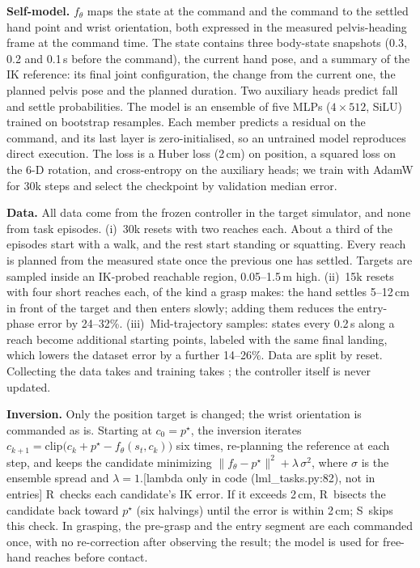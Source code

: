 \documentclass[conference]{IEEEtran}
\newif\ifdraft \drafttrue
\newcommand{\dnote}[1]{\ifdraft{\color{red}\footnotesize[#1]}\fi}
\newcommand{\Sinv}{\textsc{S}}     %
\newcommand{\Rr}{\textsc{R}}       %
\begin{document}
\textbf{Self-model.} $f_\theta$ maps the state at the command and the command to the settled hand point and wrist orientation, both expressed in the measured pelvis-heading frame at the command time. The state contains three body-state snapshots (0.3, 0.2 and 0.1\,s before the command), the current hand pose, and a summary of the IK reference: its final joint configuration, the change from the current one, the planned pelvis pose and the planned duration. Two auxiliary heads predict fall and settle probabilities. The model is an ensemble of five MLPs ($4\times512$, SiLU) trained on bootstrap resamples. Each member predicts a residual on the command, and its last layer is zero-initialised, so an untrained model reproduces direct execution. The loss is a Huber loss (2\,cm) on position, a squared loss on the 6-D rotation, and cross-entropy on the auxiliary heads; we train with AdamW for 30k steps and select the checkpoint by validation median error.

\textbf{Data.} All data come from the frozen controller in the target simulator, and none from task episodes. (i)~30k resets with two reaches each. About a third of the episodes start with a walk, and the rest start standing or squatting. Every reach is planned from the measured state once the previous one has settled. Targets are sampled inside an IK-probed reachable region, 0.05--1.5\,m high. (ii)~15k resets with four short reaches each, of the kind a grasp makes: the hand settles 5--12\,cm in front of the target and then enters slowly; adding them reduces the entry-phase error by 24--32\%. (iii)~Mid-trajectory samples: states every 0.2\,s along a reach become additional starting points, labeled with the same final landing, which lowers the dataset error by a further 14--26\%. Data are split by reset. Collecting the data takes  and training takes ; the controller itself is never updated.

\textbf{Inversion.} Only the position target is changed; the wrist orientation is commanded as is. Starting at $c_0=p^\star$, the inversion iterates $c_{k+1}=\mathrm{clip}\big(c_k+p^\star-f_\theta(s_t,c_k)\big)$ six times, re-planning the reference at each step, and keeps the candidate minimizing $\lVert f_\theta-p^\star\rVert^2+\lambda\,\sigma^2$, where $\sigma$ is the ensemble spread and $\lambda=1$.\dnote{lambda only in code (lml\_tasks.py:82), not in entries}
\Rr\ checks each candidate's IK error. If it exceeds 2\,cm, \Rr\ bisects the candidate back toward $p^\star$ (six halvings) until the error is within 2\,cm; \Sinv\ skips this check. In grasping, the pre-grasp and the entry segment are each commanded once, with no re-correction after observing the result; the model is used for free-hand reaches before contact.
\end{document}
